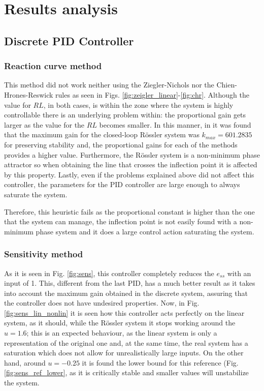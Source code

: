 \section{Results analysis}\label{sec:resultAn}
\subsection{Discrete PID Controller}
\subsubsection{Reaction curve method}
This method did not work neither using the Ziegler-Nichols nor the Chien-Hrones-Reswick rules as seen in Figs. \ref{fig:zeigler_linear}-\ref{fig:chr}. Although the value for $RL$, in both cases, is within the zone where the system is highly controllable there is an underlying problem within: the proportional gain gets larger as the value for the $RL$ becomes smaller. In this manner, in \cite{JS_PL2} it was found that the maximum gain for the closed-loop Rössler system was $k_{max}=601.2835$ for preserving stability and, the proportional gains for each of the methods provides a higher value. 
Furthermore, the Rössler system is a non-minimum phase attractor so when obtaining the line that crosses the inflection point it is affected by this property. Lastly, even if the problems explained above did not affect this controller, the parameters for the PID controller are large enough to always saturate the system.

Therefore, this heuristic fails as the proportional constant is higher than the one that the system can manage, the inflection point is not easily found with a non-minimum phase system and it does a large control action saturating the system.

\subsubsection{Sensitivity method}
As it is seen in Fig. \ref{fig:sens}, this controller completely reduces the $e_{ss}$ with an input of 1. This, different from the last PID, has a much better result as it takes into account the maximum gain obtained in the discrete system, assuring that the controller does not have undesired properties. Now, in Fig. \ref{fig:sens_lin_nonlin} it is seen how this controller acts perfectly on the linear system, as it should, while the Rössler system it stops working around the $u=1.6$; this is an expected behaviour, as the linear system is only a representation of the original one and, at the same time, the real system has a saturation which does not allow for unrealistically large inputs. On the other hand, around $u=-0.25$ it is found the lower bound for this reference (Fig. \ref{fig:sens_ref_lower}, as it is critically stable and smaller values will unstabilize the system.

